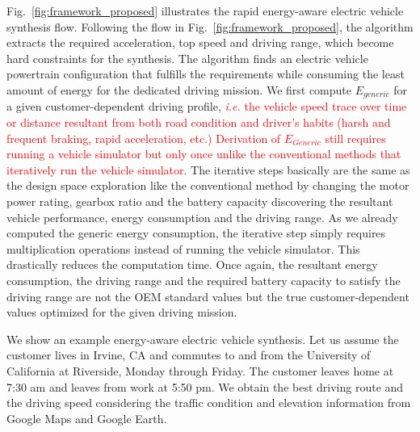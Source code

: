 \documentclass[journal]{IEEEtran}
\begin{document}
Fig.~\ref{fig:framework_proposed} illustrates the rapid energy-aware electric vehicle synthesis flow. 
Following the flow in Fig.~\ref{fig:framework_proposed}, the algorithm extracts the required acceleration, top speed and driving range, which become hard constraints for the synthesis. The algorithm finds an electric vehicle powertrain configuration that fulfills the requirements while consuming the least amount of energy for the dedicated driving mission. 
We first compute $E_{generic}$ for a given customer-dependent driving profile, \textcolor{red}{\textit{i.e.} the  vehicle speed trace over time or distance resultant from both road condition and driver's habits (harsh and frequent braking, rapid acceleration, etc.) Derivation of $E_{Generic}$ still requires running a vehicle simulator but only once unlike the conventional methods that iteratively run the vehicle simulator.} The iterative steps basically are the same as the design space exploration like the conventional method by changing the motor power rating, gearbox ratio and the battery capacity discovering the resultant vehicle performance, energy consumption and the driving range. As we already computed the generic energy consumption, the iterative step simply requires multiplication operations instead of running the vehicle simulator. This drastically reduces the computation time. Once again, the resultant energy consumption, the driving range and the required battery capacity to satisfy the driving range are not the OEM standard values but the true customer-dependent values optimized for the given driving mission. 

We show an example energy-aware electric vehicle synthesis. Let us assume the customer lives in Irvine, CA and commutes to and from the University of California at Riverside, Monday through Friday. The customer leaves home at 7:30 am and leaves from work at 5:50 pm. We obtain the best driving route and the driving speed considering the traffic condition and elevation information from Google Maps and Google Earth.
\end{document}
